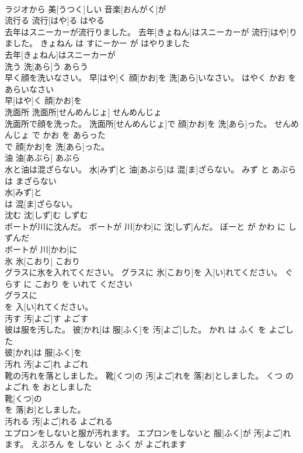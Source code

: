 \documentclass[8pt]{extreport}
\begin{document}
\begin{CJK}{UTF8}{min}
\\	ラジオから 美[うつく]しい 音楽[おんがく]が
\\	流行る	流行[はや]る	はやる	
\\	去年はスニーカーが流行りました。	去年[きょねん]はスニーカーが 流行[はや]りました。	きょねん は すにーかー が はやりました	
\\	去年[きょねん]はスニーカーが
\\	洗う	洗[あら]う	あらう	
\\	早く顔を洗いなさい。	早[はや]く 顔[かお]を 洗[あら]いなさい。	はやく かお を あらいなさい	
\\	早[はや]く 顔[かお]を
\\	洗面所	洗面所[せんめんじょ]	せんめんじょ	
\\	洗面所で顔を洗った。	洗面所[せんめんじょ]で 顔[かお]を 洗[あら]った。	せんめんじょ で かお を あらった	
\\	で 顔[かお]を 洗[あら]った。			
\\	油	油[あぶら]	あぶら	
\\	水と油は混ざらない。	水[みず]と 油[あぶら]は 混[ま]ざらない。	みず と あぶら は まざらない	
\\	水[みず]と
\\	は 混[ま]ざらない。			
\\	沈む	沈[しず]む	しずむ	
\\	ボートが川に沈んだ。	ボートが 川[かわ]に 沈[しず]んだ。	ぼーと が かわ に しずんだ	
\\	ボートが 川[かわ]に
\\	氷	氷[こおり]	こおり	
\\	グラスに氷を入れてください。	グラスに 氷[こおり]を 入[い]れてください。	ぐらす に こおり を いれて ください	
\\	グラスに
\\	を 入[い]れてください。			
\\	汚す	汚[よご]す	よごす	
\\	彼は服を汚した。	彼[かれ]は 服[ふく]を 汚[よご]した。	かれ は ふく を よごした	
\\	彼[かれ]は 服[ふく]を
\\	汚れ	汚[よご]れ	よごれ	
\\	靴の汚れを落としました。	靴[くつ]の 汚[よご]れを 落[お]としました。	くつ の よごれ を おとしました	
\\	靴[くつ]の
\\	を 落[お]としました。			
\\	汚れる	汚[よご]れる	よごれる	
\\	エプロンをしないと服が汚れます。	エプロンをしないと 服[ふく]が 汚[よご]れます。	えぷろん を しない と ふく が よごれます	

\end{CJK}
\end{document}
